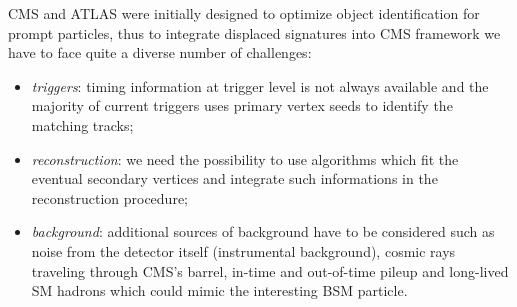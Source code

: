 CMS and ATLAS were 
initially designed to optimize object
identification for prompt particles, thus to integrate displaced
signatures into CMS framework we have to face quite a diverse number
of challenges:
\begin{itemize}
\setlength\itemsep{-0.1em}
\item \emph{triggers}: timing information at trigger level is not always
  available and the majority of current triggers uses primary vertex
  seeds to identify the matching tracks;
\item \emph{reconstruction}: we need the possibility to use algorithms which
  fit the eventual secondary vertices and integrate such informations in the
  reconstruction procedure;
\item \emph{background}: additional sources of background have to be
  considered such as noise from the detector itself (instrumental
  background), cosmic rays traveling through CMS's barrel, in-time
  and out-of-time pileup and long-lived SM hadrons which
  could mimic the interesting BSM particle.
\end{itemize}

